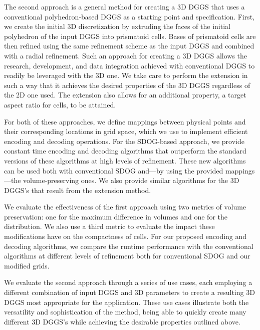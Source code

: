 The second approach is a general method for creating a 3D DGGS that uses a conventional polyhedron-based DGGS as a starting point and specification.
First, we create the initial 3D discretization by extruding the faces of the initial polyhedron of the input DGGS into prismatoid cells.
Bases of prismatoid cells are then refined using the same refinement scheme as the input DGGS and combined with a radial refinement.
Such an approach for creating a 3D DGGS allows the research, development, and data integration achieved with conventional DGGS to readily be leveraged with the 3D one.
We take care to perform the extension in such a way that it achieves the desired properties of the 3D DGGS regardless of the 2D one used.
The extension also allows for an additional property, a target aspect ratio for cells, to be attained.


For both of these approaches, we define mappings between physical points and their corresponding locations in grid space, which we use to implement efficient encoding and decoding operations.
For the SDOG-based approach, we provide constant time encoding and decoding algorithms that outperform the standard versions of these algorithms at high levels of refinement.
These new algorithms can be used both with conventional SDOG and---by using the provided mappings---the volume-preserving ones.
We also provide similar algorithms for the 3D DGGS's that result from the extension method.


We evaluate the effectiveness of the first approach using two metrics of volume preservation: one for the maximum difference in volumes and one for the distribution.
We also use a third metric to evaluate the impact these modifications have on the compactness of cells.
For our proposed encoding and decoding algorithms, we compare the runtime performance with the conventional algorithms at different levels of refinement both for conventional SDOG and our modified grids.


We evaluate the second approach through a series of use cases, each employing a different combination of input DGGS and 3D parameters to create a resulting 3D DGGS most appropriate for the application.
These use cases illustrate both the versatility and sophistication of the method, being able to quickly create many different 3D DGGS's while achieving the desirable properties outlined above.


